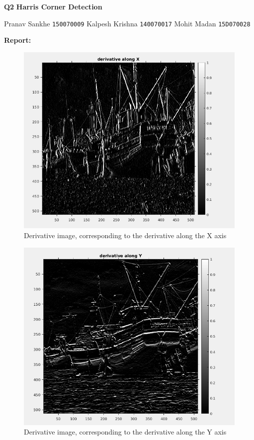 \documentclass{article}
\begin{document}
\textbf{Q2}  
\textbf{Harris Corner Detection}
\vskip 0.2in

Pranav Sankhe \texttt{150070009} \newline
Kalpesh Krishna \texttt{140070017}  \newline
Mohit Madan \texttt{15D070028} \newline

\vskip 0.5in

\textbf{Report:}  
\vskip 0.1in



\begin{figure}[h!]
  \includegraphics[width=\linewidth]{dx.png}
  \caption{Derivative image, corresponding to the derivative along the X axis}  
  \label{fig:result1}
\end{figure}

\newpage

\begin{figure}[h!]
  \includegraphics[width=\linewidth]{dy.png}
  \caption{Derivative image, corresponding to the derivative along the Y axis}
  \label{fig:result2}
\end{figure}
\end{document}

